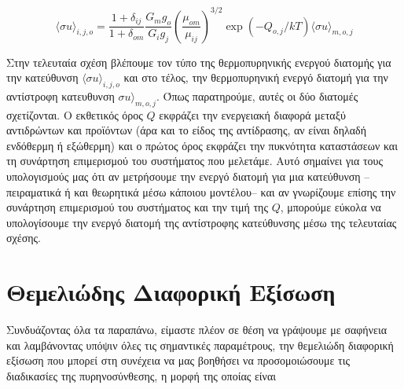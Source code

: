 \begin{equation}
\label{eq67}
\langle \sigma u \rangle _{i,j,o} = \frac{1+\delta_{ij}}{1+\delta_{om}} \frac{G_{m}g_{o}}{G_{i}g_{j}} \left(  \frac{\mu_{om}}{\mu_{ij}} \right) ^{3/2} \exp \left( -Q_{o,j}/kT \right) \langle \sigma u \rangle_{m,o,j}
\end{equation}

Στην τελευταία σχέση βλέπουμε τον τύπο της θερμοπυρηνικής ενεργού διατομής για την κατεύθυνση $\langle \sigma u \rangle _{i,j,o}$ και στο τέλος, την θερμοπυρηνική ενεργό διατομή για την αντίστροφη κατευθυνση $\sigma u \rangle_{m,o,j}$. Όπως παρατηρούμε, αυτές οι δύο διατομές σχετίζονται. Ο εκθετικός όρος $Q$ εκφράζει την ενεργειακή διαφορά μεταξύ αντιδρώντων και προϊόντων (άρα και το είδος της αντίδρασης, αν είναι δηλαδή ενδόθερμη ή εξώθερμη) και ο πρώτος όρος εκφράζει την πυκνότητα καταστάσεων και τη συνάρτηση επιμερισμού του συστήματος που μελετάμε. Αυτό σημαίνει για τους υπολογισμούς μας ότι αν μετρήσουμε την ενεργό διατομή για μια κατεύθυνση --πειραματικά ή και θεωρητικά μέσω κάποιου μοντέλου-- και αν γνωρίζουμε επίσης την συνάρτηση επιμερισμού του συστήματος και την τιμή της $Q$, μπορούμε εύκολα να υπολογίσουμε την ενεργό διατομή της αντίστροφης κατεύθυνσης μέσω της τελευταίας σχέσης.

\section{Θεμελιώδης Διαφορική Εξίσωση}
Συνδυάζοντας όλα τα παραπάνω, είμαστε πλέον σε θέση να γράψουμε με σαφήνεια και λαμβάνοντας υπόψιν όλες τις σημαντικές παραμέτρους, την θεμελιώδη διαφορική εξίσωση που μπορεί στη συνέχεια να μας βοηθήσει να προσομοιώσουμε τις διαδικασίες της πυρηνοσύνθεσης, η μορφή της οποίας είναι

